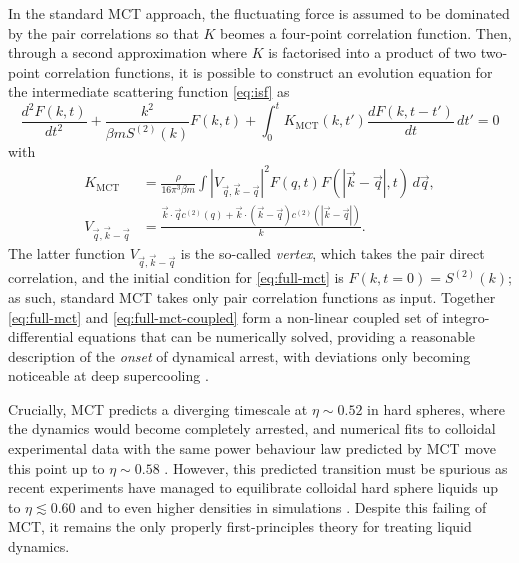 \documentclass[11pt,twoside]{report}
\begin{document}
In the standard MCT approach, the fluctuating force is assumed to be dominated by the pair correlations so that $K$ beomes a four-point correlation function.
Then, through a second approximation where $K$ is factorised into a product of two two-point correlation functions, it is possible to construct an evolution equation for the intermediate scattering function \eqref{eq:isf} as \cite{ReichmanJSM2005}
\begin{equation}\label{eq:full-mct}
  \frac{d^2 F(k,t)}{d t^2}
  + \frac{k^2}{\beta m S^{(2)}(k)} F(k, t)
  + \int_0^t K_\mathrm{MCT}(k, t') \frac{d F(k, t - t')}{dt} \, dt'
  =
  0
\end{equation}
with
\begin{subequations}\label{eq:full-mct-coupled}
  \begin{align}
    K_\mathrm{MCT}
    &=
    \frac{\rho}{16 \pi^3 \beta m}
    \int |V_{\vec{q},\vec{k}-\vec{q}}|^2
    F(q, t) F(|\vec{k} - \vec{q}|, t)
    \, d\vec{q},
    \\
    V_{\vec{q},\vec{k}-\vec{q}}
    &=
    \frac{
      \vec{k} \cdot \vec{q} c^{(2)}(q) + \vec{k} \cdot (\vec{k} - \vec{q}) c^{(2)}(|\vec{k} - \vec{q}|)
    }{
      k
    }.
  \end{align}
\end{subequations}
The latter function $V_{\vec{q},\vec{k}-\vec{q}}$ is the so-called \emph{vertex}, which takes the pair direct correlation, and the initial condition for \eqref{eq:full-mct} is $F(k,t=0) = S^{(2)}(k)$; as such, standard MCT takes only pair correlation functions as input.
Together \eqref{eq:full-mct} and \eqref{eq:full-mct-coupled} form a non-linear coupled set of integro-differential equations that can be numerically solved, providing a reasonable description of the \emph{onset} of dynamical arrest, with deviations only becoming noticeable at deep supercooling \cite{FlennerPRE2011,BrambillaPRL2009}.

Crucially, MCT predicts a diverging timescale at $\eta \sim 0.52$ in hard spheres, where the dynamics would become completely arrested, and numerical fits to colloidal experimental data with the same power behaviour law predicted by MCT move this point up to $\eta \sim 0.58$ \cite{VanMegenPRE1994}.
However, this predicted transition must be spurious as recent experiments have managed to equilibrate colloidal hard sphere liquids up to $\eta \lesssim 0.60$ \cite{BrambillaPRL2009,HallettNC2018} and to even higher densities in simulations \cite{BerthierPRL2016}.
Despite this failing of MCT, it remains the only properly first-principles theory for treating liquid dynamics.
\end{document}
